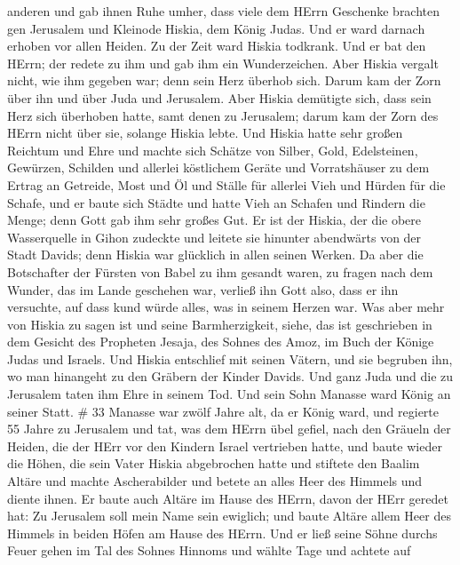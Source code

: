 anderen und gab ihnen Ruhe umher,  dass viele dem HErrn
Geschenke brachten gen Jerusalem und Kleinode Hiskia, dem König Judas.
Und er ward darnach erhoben vor allen Heiden.  Zu der Zeit
ward Hiskia todkrank. Und er bat den HErrn; der redete zu ihm und gab
ihm ein Wunderzeichen.  Aber Hiskia vergalt nicht, wie ihm
gegeben war; denn sein Herz überhob sich. Darum kam der Zorn über ihn
und über Juda und Jerusalem.  Aber Hiskia demütigte sich,
dass sein Herz sich überhoben hatte, samt denen zu Jerusalem; darum kam
der Zorn des HErrn nicht über sie, solange Hiskia lebte. 
Und Hiskia hatte sehr großen Reichtum und Ehre und machte sich Schätze
von Silber, Gold, Edelsteinen, Gewürzen, Schilden und allerlei
köstlichem Geräte  und Vorratshäuser zu dem Ertrag an
Getreide, Most und Öl und Ställe für allerlei Vieh und Hürden für die
Schafe,  und er baute sich Städte und hatte Vieh an Schafen
und Rindern die Menge; denn Gott gab ihm sehr großes Gut. 
Er ist der Hiskia, der die obere Wasserquelle in Gihon zudeckte und
leitete sie hinunter abendwärts von der Stadt Davids; denn Hiskia war
glücklich in allen seinen Werken.  Da aber die Botschafter
der Fürsten von Babel zu ihm gesandt waren, zu fragen nach dem Wunder,
das im Lande geschehen war, verließ ihn Gott also, dass er ihn
versuchte, auf dass kund würde alles, was in seinem Herzen war.
 Was aber mehr von Hiskia zu sagen ist und seine
Barmherzigkeit, siehe, das ist geschrieben in dem Gesicht des Propheten
Jesaja, des Sohnes des Amoz, im Buch der Könige Judas und Israels.
 Und Hiskia entschlief mit seinen Vätern, und sie begruben
ihn, wo man hinangeht zu den Gräbern der Kinder Davids. Und ganz Juda
und die zu Jerusalem taten ihm Ehre in seinem Tod. Und sein Sohn Manasse
ward König an seiner Statt. \# 33  Manasse war zwölf Jahre
alt, da er König ward, und regierte 55 Jahre zu Jerusalem 
und tat, was dem HErrn übel gefiel, nach den Gräueln der Heiden, die der
HErr vor den Kindern Israel vertrieben hatte,  und baute
wieder die Höhen, die sein Vater Hiskia abgebrochen hatte und stiftete
den Baalim Altäre und machte Ascherabilder und betete an alles Heer des
Himmels und diente ihnen.  Er baute auch Altäre im Hause des
HErrn, davon der HErr geredet hat: Zu Jerusalem soll mein Name sein
ewiglich;  und baute Altäre allem Heer des Himmels in beiden
Höfen am Hause des HErrn.  Und er ließ seine Söhne durchs
Feuer gehen im Tal des Sohnes Hinnoms und wählte Tage und achtete auf
